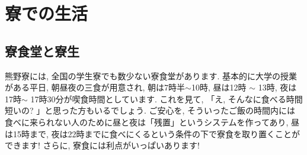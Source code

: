 \documentclass[10pt,b5jsbook,dvips,dvipdfmx,openany]{jsbook}
\theoremstyle{definition}
\begin{document}




\chapter{寮での生活} %

	\section{寮食堂と寮生}	\label{sec:cafeteria}
 	熊野寮には, 全国の学生寮でも数少ない寮食堂があります. 基本的に大学の授業がある平日, 朝昼夜の三食が用意され, 朝は7時半$\sim$10時, 昼は12時 $ \sim $ 13時, 夜は17時$ \sim $ 17時30分が喫食時間としています. これを見て, 「え, そんなに食べる時間短いの? 」と思った方もいるでしょう. ご安心を, そういったご飯の時間内には食べに来られない人のために昼と夜は「残置」というシステムを作ってあり, 昼は15時まで, 夜は22時までに食べにくるという条件の下で寮食を取り置くことができます! さらに, 寮食には利点がいっぱいあります!
\end{document}
